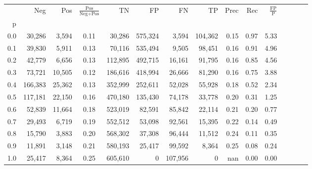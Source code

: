 \begin{tabular}{rrrcrrrrrrrrrrr}
\toprule
{} &      Neg &     Pos & $\frac{\text{Pos}}{\text{Neg}+\text{Pos}}$ &       TN &       FP &       FN &       TP &  Prec &   Rec & $\frac{\text{FP}}{\text{P}}$ \\
p   &          &         &                                            &          &          &          &          &       &       &                              \\
\midrule
0.0 &   30,286 &   3,594 &                                       0.11 &   30,286 &  575,324 &    3,594 &  104,362 &  0.15 &  0.97 &                         5.33 \\
0.1 &   39,830 &   5,911 &                                       0.13 &   70,116 &  535,494 &    9,505 &   98,451 &  0.16 &  0.91 &                         4.96 \\
0.2 &   42,779 &   6,656 &                                       0.13 &  112,895 &  492,715 &   16,161 &   91,795 &  0.16 &  0.85 &                         4.56 \\
0.3 &   73,721 &  10,505 &                                       0.12 &  186,616 &  418,994 &   26,666 &   81,290 &  0.16 &  0.75 &                         3.88 \\
0.4 &  166,383 &  25,362 &                                       0.13 &  352,999 &  252,611 &   52,028 &   55,928 &  0.18 &  0.52 &                         2.34 \\
0.5 &  117,181 &  22,150 &                                       0.16 &  470,180 &  135,430 &   74,178 &   33,778 &  0.20 &  0.31 &                         1.25 \\
0.6 &   52,839 &  11,664 &                                       0.18 &  523,019 &   82,591 &   85,842 &   22,114 &  0.21 &  0.20 &                         0.77 \\
0.7 &   29,493 &   6,719 &                                       0.19 &  552,512 &   53,098 &   92,561 &   15,395 &  0.22 &  0.14 &                         0.49 \\
0.8 &   15,790 &   3,883 &                                       0.20 &  568,302 &   37,308 &   96,444 &   11,512 &  0.24 &  0.11 &                         0.35 \\
0.9 &   11,891 &   3,148 &                                       0.21 &  580,193 &   25,417 &   99,592 &    8,364 &  0.25 &  0.08 &                         0.24 \\
1.0 &   25,417 &   8,364 &                                       0.25 &  605,610 &        0 &  107,956 &        0 &   nan &  0.00 &                         0.00 \\
\bottomrule
\end{tabular}
